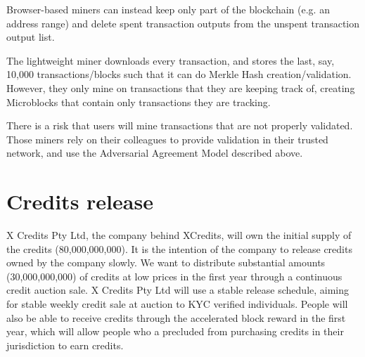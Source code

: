 \documentclass[a4paper,12pt]{article}
\begin{document}
Browser-based miners can instead keep only part of the blockchain (e.g. an address range) and delete spent transaction outputs from the unspent transaction output list. 

The lightweight miner downloads every transaction, and stores the last, say, 10,000 transactions/blocks such that it can do Merkle Hash creation/validation. However, they only mine on transactions that they are keeping track of, creating Microblocks that contain only transactions they are tracking. 

There is a risk that users will mine transactions that are not properly validated. Those miners rely on their colleagues to provide validation in their trusted network, and use the Adversarial Agreement Model described above.


\section{Credits release}
X Credits Pty Ltd, the company behind XCredits, will own the initial supply of the credits (80,000,000,000). It is the intention of the company to release credits owned by the company slowly. We want to distribute substantial amounts (30,000,000,000) of credits at low prices in the first year through a continuous credit auction sale. X Credits Pty Ltd will use a stable release schedule, aiming for stable weekly credit sale at auction to KYC verified individuals. People will also be able to receive credits through the accelerated block reward in the first year, which will allow people who a precluded from purchasing credits in their jurisdiction to earn credits.
\end{document}
